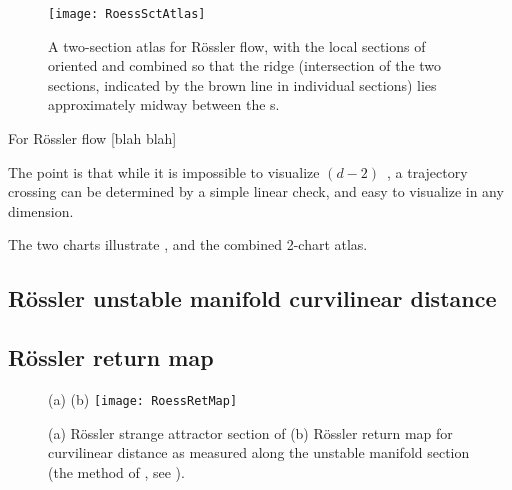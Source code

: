 \begin{figure}%
\begin{center}
  \texttt{[image: RoessSctAtlas]}
\end{center}
  \caption{
  A two-section atlas for R\"ossler flow, with the local sections of
   oriented and combined so that the ridge (intersection
  of the two sections, indicated by the brown line in individual
  sections) lies  approximately midway between the \template s.
  } \label{fig:RoessSctAtlas}
\end{figure}

    \ifdraft\color{blue}

For R\"ossler flow 
[blah blah]

The point is that while it is impossible to visualize  $(d\!-\!2)$\dmn\
{\poincBord}, a trajectory crossing can be determined by a simple linear
check, and easy to visualize in any dimension.


The two charts
 illustrate \poincBord,
and  the combined 2-chart atlas.

\subsection{R\"ossler unstable manifold curvilinear distance}
\subsection{R\"ossler return map}

\begin{figure}
\begin{center}
(a) %
(b) \texttt{[image: RoessRetMap]}
\end{center}
  \caption{
(a) R\"ossler strange attractor section of 
(b) R\"ossler return map for curvilinear distance as measured
along the unstable manifold section (the method of
, see ).
  }
\label{fig:RoessRetMap}
\end{figure}

